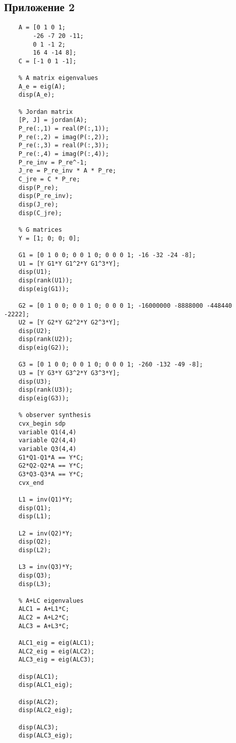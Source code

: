 \documentclass[a4paper, 12pt]{article}
\begin{document}
    \subsection{Приложение 2}
    \begin{lstlisting}[label=task2, caption={Программа для второго задания}]
    % input data
    A = [0 1 0 1;
        -26 -7 20 -11;
        0 1 -1 2;
        16 4 -14 8];
    C = [-1 0 1 -1];

    % A matrix eigenvalues
    A_e = eig(A);
    disp(A_e);

    % Jordan matrix
    [P, J] = jordan(A);
    P_re(:,1) = real(P(:,1));
    P_re(:,2) = imag(P(:,2));
    P_re(:,3) = real(P(:,3));
    P_re(:,4) = imag(P(:,4));
    P_re_inv = P_re^-1; 
    J_re = P_re_inv * A * P_re;
    C_jre = C * P_re;
    disp(P_re);
    disp(P_re_inv);
    disp(J_re);
    disp(C_jre);

    % G matrices
    Y = [1; 0; 0; 0];

    G1 = [0 1 0 0; 0 0 1 0; 0 0 0 1; -16 -32 -24 -8];
    U1 = [Y G1*Y G1^2*Y G1^3*Y];
    disp(U1);
    disp(rank(U1));
    disp(eig(G1));

    G2 = [0 1 0 0; 0 0 1 0; 0 0 0 1; -16000000 -8888000 -448440 -2222];
    U2 = [Y G2*Y G2^2*Y G2^3*Y];
    disp(U2);
    disp(rank(U2));
    disp(eig(G2));

    G3 = [0 1 0 0; 0 0 1 0; 0 0 0 1; -260 -132 -49 -8];
    U3 = [Y G3*Y G3^2*Y G3^3*Y];
    disp(U3);
    disp(rank(U3));
    disp(eig(G3));

    % observer synthesis
    cvx_begin sdp
    variable Q1(4,4)
    variable Q2(4,4)
    variable Q3(4,4)
    G1*Q1-Q1*A == Y*C;
    G2*Q2-Q2*A == Y*C;
    G3*Q3-Q3*A == Y*C;
    cvx_end

    L1 = inv(Q1)*Y;
    disp(Q1);
    disp(L1);

    L2 = inv(Q2)*Y;
    disp(Q2);
    disp(L2);

    L3 = inv(Q3)*Y;
    disp(Q3);
    disp(L3);

    % A+LC eigenvalues
    ALC1 = A+L1*C;
    ALC2 = A+L2*C;
    ALC3 = A+L3*C;

    ALC1_eig = eig(ALC1);
    ALC2_eig = eig(ALC2);
    ALC3_eig = eig(ALC3);

    disp(ALC1);
    disp(ALC1_eig);

    disp(ALC2);
    disp(ALC2_eig);

    disp(ALC3);
    disp(ALC3_eig);
    \end{lstlisting}
\end{document}
